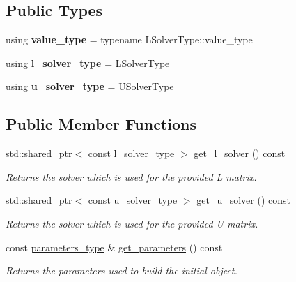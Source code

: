 \subsection*{Public Types}
\begin{DoxyCompactItemize}
\item 
\mbox{\label{classgko_1_1preconditioner_1_1Ilu_a54ed2e0d982bd31235e6472ccd4bf22b}} 
using {\bfseries value\+\_\+type} = typename L\+Solver\+Type\+::value\+\_\+type
\item 
\mbox{\label{classgko_1_1preconditioner_1_1Ilu_a619dad51fa3bb05a5372ac877006976c}} 
using {\bfseries l\+\_\+solver\+\_\+type} = L\+Solver\+Type
\item 
\mbox{\label{classgko_1_1preconditioner_1_1Ilu_adae607f25edc0d4bb1e2a7669d9f7d80}} 
using {\bfseries u\+\_\+solver\+\_\+type} = U\+Solver\+Type
\end{DoxyCompactItemize}
\subsection*{Public Member Functions}
\begin{DoxyCompactItemize}
\item 
std\+::shared\+\_\+ptr$<$ const l\+\_\+solver\+\_\+type $>$ \hyperlink{classgko_1_1preconditioner_1_1Ilu_aa5a2eb4335618ea11a65b735b058afb1}{get\+\_\+l\+\_\+solver} () const
\begin{DoxyCompactList}\small\item\em Returns the solver which is used for the provided L matrix. \end{DoxyCompactList}\item 
std\+::shared\+\_\+ptr$<$ const u\+\_\+solver\+\_\+type $>$ \hyperlink{classgko_1_1preconditioner_1_1Ilu_a59f3fbe0e393f48c900a06479dab618a}{get\+\_\+u\+\_\+solver} () const
\begin{DoxyCompactList}\small\item\em Returns the solver which is used for the provided U matrix. \end{DoxyCompactList}\item 
const \hyperlink{structgko_1_1preconditioner_1_1Ilu_1_1parameters__type}{parameters\+\_\+type} \& \hyperlink{classgko_1_1preconditioner_1_1Ilu_a8dd037ae6495721bb74aa4ecd1d5d564}{get\+\_\+parameters} () const
\begin{DoxyCompactList}\small\item\em Returns the parameters used to build the initial object. \end{DoxyCompactList}\end{DoxyCompactItemize}
